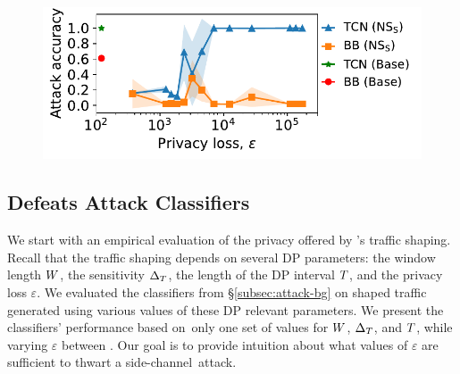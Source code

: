 \begin{figure}[t]
    \centering
    \includegraphics[width=0.85\columnwidth]{accuracy_vs_privacy_loss_video_updated.pdf}
    \caption{
    }
    \vspace{-0.4cm}
    \label{fig:empirical-privacy}
\end{figure}

\subsection{{\sys} Defeats Attack Classifiers}
\label{subsec:attack-eval}
We start with an empirical evaluation of the privacy offered by {\sys}'s traffic
shaping. Recall that the traffic shaping depends on several DP parameters: the
window length $W$, the sensitivity $\Delta_T$, the length of the DP
interval $T$, and the privacy loss $\varepsilon$.
We evaluated the classifiers from \S\ref{subsec:attack-bg} on shaped traffic generated using various values of these DP relevant parameters.
We present the classifiers' performance based on~only one set of values for
$W$, $\Delta_T$, and $T$, while varying $\varepsilon$ between
\update{[200, 200000]}.
Our goal is to provide intuition about what values of $\varepsilon$ are
sufficient to thwart a side-channel~attack.

